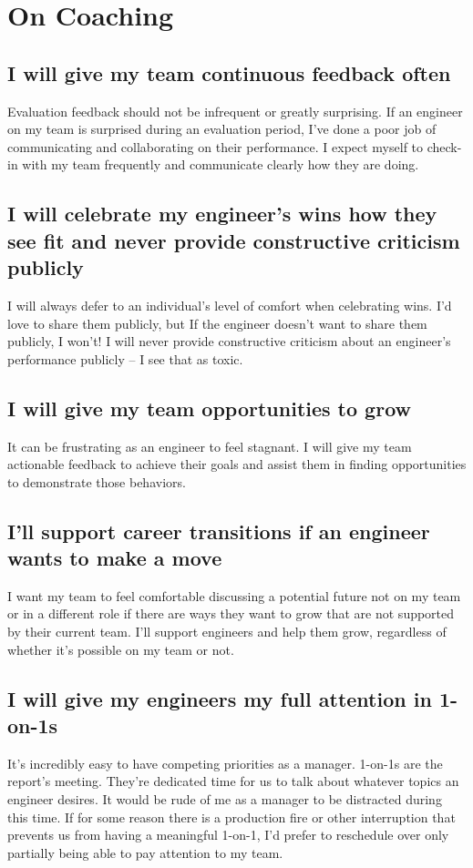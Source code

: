 \documentclass[11pt]{amsart}
\begin{document}
\section{On Coaching} %

\subsection{I will give my team continuous feedback often} 
Evaluation feedback should not be infrequent or greatly surprising. If an engineer on my team is surprised during an evaluation period, I’ve done a poor job of communicating and collaborating on their performance. I expect myself to check-in with my team frequently and communicate clearly how they are doing.

\subsection{I will celebrate my engineer's wins how they see fit and never provide constructive criticism publicly}
I will always defer to an individual's level of comfort when celebrating wins. I’d love to share them publicly, but If the engineer doesn't want to share them publicly, I won’t! I will never provide constructive criticism about an engineer's performance publicly – I see that as toxic.

\subsection{I will give my team opportunities to grow}
It can be frustrating as an engineer to feel stagnant. I will give my team actionable feedback to achieve their goals and assist them in finding opportunities to demonstrate those behaviors.

\subsection{I’ll support career transitions if an engineer wants to make a move}
I want my team to feel comfortable discussing a potential future not on my team or in a different role if there are ways they want to grow that are not supported by their current team. I’ll support engineers and help them grow, regardless of whether it’s possible on my team or not.

\subsection{I will give my engineers my full attention in 1-on-1s}
It’s incredibly easy to have competing priorities as a manager. 1-on-1s are the report's meeting. They’re dedicated time for us to talk about whatever topics an engineer desires. It would be rude of me as a manager to be distracted during this time. If for some reason there is a production fire or other interruption that prevents us from having a meaningful 1-on-1, I’d prefer to reschedule over only partially being able to pay attention to my team.
\end{document}
